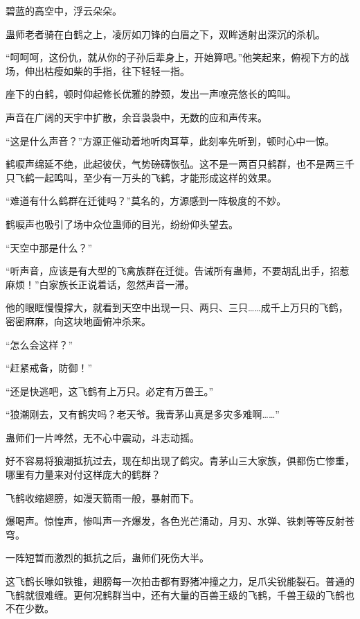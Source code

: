 
\begin{this_body}

碧蓝的高空中，浮云朵朵。

蛊师老者骑在白鹤之上，凌厉如刀锋的白眉之下，双眸透射出深沉的杀机。

“呵呵呵，这份仇，就从你的子孙后辈身上，开始算吧。”他笑起来，俯视下方的战场，伸出枯瘦如柴的手指，往下轻轻一指。

座下的白鹤，顿时仰起修长优雅的脖颈，发出一声嘹亮悠长的鸣叫。

声音在广阔的天宇中扩散，余音袅袅中，无数的应和声传来。

“这是什么声音？”方源正催动着地听肉耳草，此刻率先听到，顿时心中一惊。

鹤唳声绵延不绝，此起彼伏，气势磅礴恢弘。这不是一两百只鹤群，也不是两三千只飞鹤一起鸣叫，至少有一万头的飞鹤，才能形成这样的效果。

“难道有什么鹤群在迁徙吗？”莫名的，方源感到一阵极度的不妙。

鹤唳声也吸引了场中众位蛊师的目光，纷纷仰头望去。

“天空中那是什么？”

“听声音，应该是有大型的飞禽族群在迁徙。告诫所有蛊师，不要胡乱出手，招惹麻烦！”白家族长正说着话，忽然声音一滞。

他的眼眶慢慢撑大，就看到天空中出现一只、两只、三只……成千上万只的飞鹤，密密麻麻，向这块地面俯冲杀来。

“怎么会这样？”

“赶紧戒备，防御！”

“还是快逃吧，这飞鹤有上万只。必定有万兽王。”

“狼潮刚去，又有鹤灾吗？老天爷。我青茅山真是多灾多难啊……”

蛊师们一片哗然，无不心中震动，斗志动摇。

好不容易将狼潮抵抗过去，现在却出现了鹤灾。青茅山三大家族，俱都伤亡惨重，哪里有力量来对付这样庞大的鹤群？

飞鹤收缩翅膀，如漫天箭雨一般，暴射而下。

爆喝声。惊惶声，惨叫声一齐爆发，各色光芒涌动，月刃、水弹、铁刺等等反射苍穹。

一阵短暂而激烈的抵抗之后，蛊师们死伤大半。

这飞鹤长喙如铁锥，翅膀每一次拍击都有野猪冲撞之力，足爪尖锐能裂石。普通的飞鹤就很难缠。更何况鹤群当中，还有大量的百兽王级的飞鹤，千兽王级的飞鹤也不在少数。


\end{this_body}
